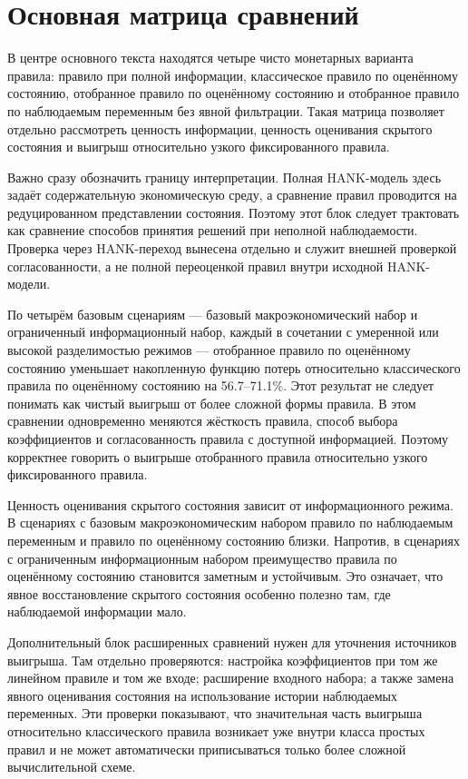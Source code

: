\section{Основная матрица сравнений}

В центре основного текста находятся четыре чисто монетарных варианта правила: правило при полной информации, классическое правило по оценённому состоянию, отобранное правило по оценённому состоянию и отобранное правило по наблюдаемым переменным без явной фильтрации. Такая матрица позволяет отдельно рассмотреть ценность информации, ценность оценивания скрытого состояния и выигрыш относительно узкого фиксированного правила.

Важно сразу обозначить границу интерпретации. Полная HANK-модель здесь задаёт содержательную экономическую среду, а сравнение правил проводится на редуцированном представлении состояния. Поэтому этот блок следует трактовать как сравнение способов принятия решений при неполной наблюдаемости. Проверка через HANK-переход вынесена отдельно и служит внешней проверкой согласованности, а не полной переоценкой правил внутри исходной HANK-модели.

По четырём базовым сценариям --- базовый макроэкономический набор и ограниченный информационный набор, каждый в сочетании с умеренной или высокой разделимостью режимов --- отобранное правило по оценённому состоянию уменьшает накопленную функцию потерь относительно классического правила по оценённому состоянию на 56.7--71.1\%. Этот результат не следует понимать как чистый выигрыш от более сложной формы правила. В этом сравнении одновременно меняются жёсткость правила, способ выбора коэффициентов и согласованность правила с доступной информацией. Поэтому корректнее говорить о выигрыше отобранного правила относительно узкого фиксированного правила.

Ценность оценивания скрытого состояния зависит от информационного режима. В сценариях с базовым макроэкономическим набором правило по наблюдаемым переменным и правило по оценённому состоянию близки. Напротив, в сценариях с ограниченным информационным набором преимущество правила по оценённому состоянию становится заметным и устойчивым. Это означает, что явное восстановление скрытого состояния особенно полезно там, где наблюдаемой информации мало.

Дополнительный блок расширенных сравнений нужен для уточнения источников выигрыша. Там отдельно проверяются: настройка коэффициентов при том же линейном правиле и том же входе; расширение входного набора; а также замена явного оценивания состояния на использование истории наблюдаемых переменных. Эти проверки показывают, что значительная часть выигрыша относительно классического правила возникает уже внутри класса простых правил и не может автоматически приписываться только более сложной вычислительной схеме.

